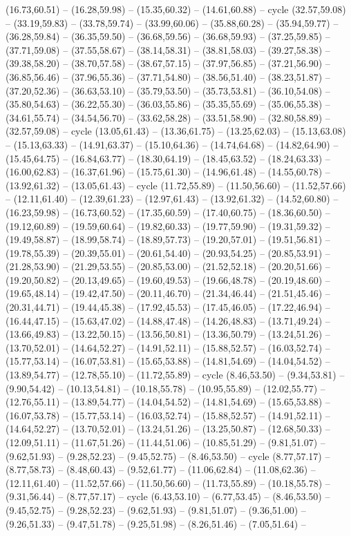 {(16.73,60.51) -- (16.28,59.98) -- (15.35,60.32) -- (14.61,60.88) -- cycle (32.57,59.08) -- (33.19,59.83) -- (33.78,59.74) -- (33.99,60.06) -- (35.88,60.28) -- (35.94,59.77) -- (36.28,59.84) -- (36.35,59.50) -- (36.68,59.56) -- (36.68,59.93) -- (37.25,59.85) -- (37.71,59.08) -- (37.55,58.67) -- (38.14,58.31) -- (38.81,58.03) -- (39.27,58.38) -- (39.38,58.20) -- (38.70,57.58) -- (38.67,57.15) -- (37.97,56.85) -- (37.21,56.90) -- (36.85,56.46) -- (37.96,55.36) -- (37.71,54.80) -- (38.56,51.40) -- (38.23,51.87) -- (37.20,52.36) -- (36.63,53.10) -- (35.79,53.50) -- (35.73,53.81) -- (36.10,54.08) -- (35.80,54.63) -- (36.22,55.30) -- (36.03,55.86) -- (35.35,55.69) -- (35.06,55.38) -- (34.61,55.74) -- (34.54,56.70) -- (33.62,58.28) -- (33.51,58.90) -- (32.80,58.89) -- (32.57,59.08) -- cycle (13.05,61.43) -- (13.36,61.75) -- (13.25,62.03) -- (15.13,63.08) -- (15.13,63.33) -- (14.91,63.37) -- (15.10,64.36) -- (14.74,64.68) -- (14.82,64.90) -- (15.45,64.75) -- (16.84,63.77) -- (18.30,64.19) -- (18.45,63.52) -- (18.24,63.33) -- (16.00,62.83) -- (16.37,61.96) -- (15.75,61.30) -- (14.96,61.48) -- (14.55,60.78) -- (13.92,61.32) -- (13.05,61.43) -- cycle (11.72,55.89) -- (11.50,56.60) -- (11.52,57.66) -- (12.11,61.40) -- (12.39,61.23) -- (12.97,61.43) -- (13.92,61.32) -- (14.52,60.80) -- (16.23,59.98) -- (16.73,60.52) -- (17.35,60.59) -- (17.40,60.75) -- (18.36,60.50) -- (19.12,60.89) -- (19.59,60.64) -- (19.82,60.33) -- (19.77,59.90) -- (19.31,59.32) -- (19.49,58.87) -- (18.99,58.74) -- (18.89,57.73) -- (19.20,57.01) -- (19.51,56.81) -- (19.78,55.39) -- (20.39,55.01) -- (20.61,54.40) -- (20.93,54.25) -- (20.85,53.91) -- (21.28,53.90) -- (21.29,53.55) -- (20.85,53.00) -- (21.52,52.18) -- (20.20,51.66) -- (19.20,50.82) -- (20.13,49.65) -- (19.60,49.53) -- (19.66,48.78) -- (20.19,48.60) -- (19.65,48.14) -- (19.42,47.50) -- (20.11,46.70) -- (21.34,46.44) -- (21.51,45.46) -- (20.31,44.71) -- (19.44,45.38) -- (17.92,45.53) -- (17.45,46.05) -- (17.22,46.94) -- (16.44,47.15) -- (15.63,47.02) -- (14.88,47.48) -- (14.26,48.83) -- (13.71,49.24) -- (13.66,49.83) -- (13.22,50.15) -- (13.56,50.81) -- (13.36,50.79) -- (13.24,51.26) -- (13.70,52.01) -- (14.64,52.27) -- (14.91,52.11) -- (15.88,52.57) -- (16.03,52.74) -- (15.77,53.14) -- (16.07,53.81) -- (15.65,53.88) -- (14.81,54.69) -- (14.04,54.52) -- (13.89,54.77) -- (12.78,55.10) -- (11.72,55.89) -- cycle (8.46,53.50) -- (9.34,53.81) -- (9.90,54.42) -- (10.13,54.81) -- (10.18,55.78) -- (10.95,55.89) -- (12.02,55.77) -- (12.76,55.11) -- (13.89,54.77) -- (14.04,54.52) -- (14.81,54.69) -- (15.65,53.88) -- (16.07,53.78) -- (15.77,53.14) -- (16.03,52.74) -- (15.88,52.57) -- (14.91,52.11) -- (14.64,52.27) -- (13.70,52.01) -- (13.24,51.26) -- (13.25,50.87) -- (12.68,50.33) -- (12.09,51.11) -- (11.67,51.26) -- (11.44,51.06) -- (10.85,51.29) -- (9.81,51.07) -- (9.62,51.93) -- (9.28,52.23) -- (9.45,52.75) -- (8.46,53.50) -- cycle (8.77,57.17) -- (8.77,58.73) -- (8.48,60.43) -- (9.52,61.77) -- (11.06,62.84) -- (11.08,62.36) -- (12.11,61.40) -- (11.52,57.66) -- (11.50,56.60) -- (11.73,55.89) -- (10.18,55.78) -- (9.31,56.44) -- (8.77,57.17) -- cycle (6.43,53.10) -- (6.77,53.45) -- (8.46,53.50) -- (9.45,52.75) -- (9.28,52.23) -- (9.62,51.93) -- (9.81,51.07) -- (9.36,51.00) -- (9.26,51.33) -- (9.47,51.78) -- (9.25,51.98) -- (8.26,51.46) -- (7.05,51.64) -- }
